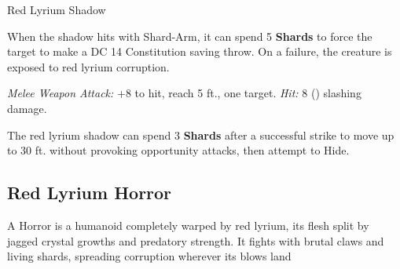 \documentclass{apotheosis-book}
\begin{document}
\begin{monsterbox}{Red Lyrium Shadow}
\begin{rpg-monsteraction}
When the shadow hits with Shard-Arm, it can spend 5 \textbf{Shards} to force the target to make a DC 14 Constitution saving throw. On a failure, the creature is exposed to red lyrium corruption.
\end{rpg-monsteraction}


\begin{rpg-monsteraction}
\textit{Melee Weapon Attack:} +8 to hit, reach 5 ft., one target. \textit{Hit:} 8 () slashing damage.
\end{rpg-monsteraction}


\begin{rpg-monsteraction}[Vanish]
The red lyrium shadow can spend 3 \textbf{Shards} after a successful strike to move up to 30 ft. without provoking opportunity attacks, then attempt to Hide.
\end{rpg-monsteraction}

\end{monsterbox}

\newpage

\subsection{Red Lyrium Horror}

A Horror is a humanoid completely warped by red lyrium, its flesh split by jagged crystal growths and predatory strength. It fights with brutal claws and living shards, spreading corruption wherever its blows land
\end{document}
